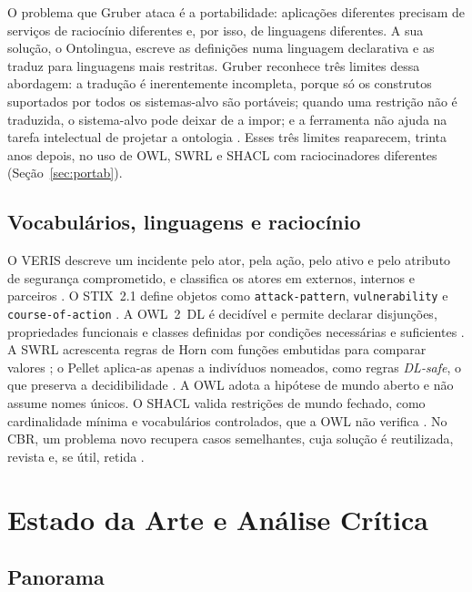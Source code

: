\documentclass[12pt]{article}
\begin{document}
O problema que Gruber ataca é a portabilidade: aplicações diferentes precisam de serviços de raciocínio diferentes e, por isso, de linguagens diferentes. A sua solução, o Ontolingua, escreve as definições numa linguagem declarativa e as traduz para linguagens mais restritas. Gruber reconhece três limites dessa abordagem: a tradução é inerentemente incompleta, porque só os construtos suportados por todos os sistemas-alvo são portáveis; quando uma restrição não é traduzida, o sistema-alvo pode deixar de a impor; e a ferramenta não ajuda na tarefa intelectual de projetar a ontologia \cite{gruber1993}. Esses três limites reaparecem, trinta anos depois, no uso de OWL, SWRL e SHACL com raciocinadores diferentes (Seção~\ref{sec:portab}).

\subsection{Vocabulários, linguagens e raciocínio}

O VERIS descreve um incidente pelo ator, pela ação, pelo ativo e pelo atributo de segurança comprometido, e classifica os atores em externos, internos e parceiros \cite{veris}. O STIX~2.1 define objetos como \texttt{attack-pattern}, \texttt{vulnerability} e \texttt{course-of-action} \cite{stix21}. A OWL~2~DL é decidível e permite declarar disjunções, propriedades funcionais e classes definidas por condições necessárias e suficientes \cite{owl2}. A SWRL acrescenta regras de Horn com funções embutidas para comparar valores \cite{swrl}; o Pellet aplica-as apenas a indivíduos nomeados, como regras \emph{DL-safe}, o que preserva a decidibilidade \cite{motik2005,pellet}. A OWL adota a hipótese de mundo aberto e não assume nomes únicos. O SHACL valida restrições de mundo fechado, como cardinalidade mínima e vocabulários controlados, que a OWL não verifica \cite{shacl}. No CBR, um problema novo recupera casos semelhantes, cuja solução é reutilizada, revista e, se útil, retida \cite{aamodt1994}.

\section{Estado da Arte e Análise Crítica}
\label{sec:sota}

\subsection{Panorama}
\end{document}
